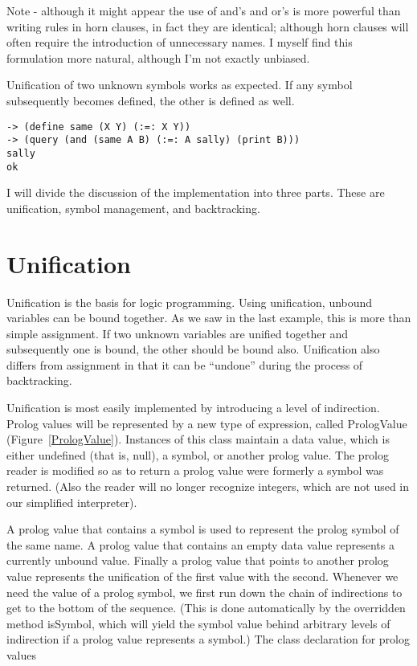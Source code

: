 Note - although it might appear the use of and's and or's is more powerful than
writing rules in horn clauses, in fact they are identical; although horn clauses
will often require the introduction of unnecessary names.  I myself find this
formulation more natural, although I'm not exactly unbiased.

Unification of two unknown symbols works as expected.  If any symbol
subsequently becomes defined, the other is defined as well.
\begin{lstlisting}
-> (define same (X Y) (:=: X Y))
-> (query (and (same A B) (:=: A sally) (print B)))
sally
ok
\end{lstlisting}

I will divide the discussion of the implementation into three parts.  These are
unification, symbol management, and backtracking.

\section{Unification}

Unification is the basis for logic programming.  Using unification, unbound
variables can be bound together.  As we saw in the last example, this is more
than simple assignment.  If two unknown variables are unified together and
subsequently one is bound, the other should be bound also.  Unification also
differs from assignment in that it can be ``undone'' during the process of
backtracking.

Unification is most easily implemented by introducing a level of indirection.
Prolog values will be represented by a new type of expression, called {\sf
    PrologValue} (Figure~\ref{PrologValue}).  Instances of this class maintain a
data value, which is either undefined (that is, null), a symbol, or another
prolog value.  The prolog reader is modified so as to return a prolog value were
formerly a symbol was returned.  (Also the reader will no longer recognize
integers, which are not used in our simplified interpreter).

A prolog value that contains a symbol is used to represent the prolog symbol of
the same name.  A prolog value that contains an empty data value represents a
currently unbound value.  Finally a prolog value that points to another prolog
value represents the unification of the first value with the second.  Whenever
we need the value of a prolog symbol, we first run down the chain of
indirections to get to the bottom of the sequence.  (This is done automatically
by the overridden method {\sf isSymbol}, which will yield the symbol value
behind arbitrary levels of indirection if a prolog value represents a symbol.)
%
{The class declaration for prolog values}

